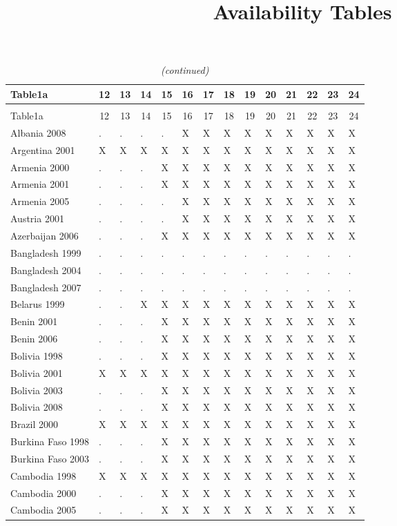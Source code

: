 \documentclass[a4paper]{article}
\begin{document}
\title{Availability Tables}
\maketitle


\pagebreak
%

\setlongtables


\begin{longtable}{llllllllllllll} \caption{Availability In Union}\tabularnewline
 \hline\hline
\multicolumn{1}{l}{Table1a}&\multicolumn{1}{c}{12}&\multicolumn{1}{c}{13}&\multicolumn{1}{c}{14}&\multicolumn{1}{c}{15}&\multicolumn{1}{c}{16}&\multicolumn{1}{c}{17}&\multicolumn{1}{c}{18}&\multicolumn{1}{c}{19}&\multicolumn{1}{c}{20}&\multicolumn{1}{c}{21}&\multicolumn{1}{c}{22}&\multicolumn{1}{c}{23}&\multicolumn{1}{c}{24}\tabularnewline
\hline
\endfirsthead
\caption[]{\em (continued)} \tabularnewline
\hline
\multicolumn{1}{l}{Table1a}&\multicolumn{1}{c}{12}&\multicolumn{1}{c}{13}&\multicolumn{1}{c}{14}&\multicolumn{1}{c}{15}&\multicolumn{1}{c}{16}&\multicolumn{1}{c}{17}&\multicolumn{1}{c}{18}&\multicolumn{1}{c}{19}&\multicolumn{1}{c}{20}&\multicolumn{1}{c}{21}&\multicolumn{1}{c}{22}&\multicolumn{1}{c}{23}&\multicolumn{1}{c}{24}\tabularnewline
\hline
\endhead
\hline
\endfoot
\label{Table1a}
Albania 2008&.&.&.&.&X&X&X&X&X&X&X&X&X\tabularnewline
Argentina 2001&X&X&X&X&X&X&X&X&X&X&X&X&X\tabularnewline
Armenia 2000&.&.&.&X&X&X&X&X&X&X&X&X&X\tabularnewline
Armenia 2001&.&.&.&X&X&X&X&X&X&X&X&X&X\tabularnewline
Armenia 2005&.&.&.&.&X&X&X&X&X&X&X&X&X\tabularnewline
Austria 2001&.&.&.&.&X&X&X&X&X&X&X&X&X\tabularnewline
Azerbaijan 2006&.&.&.&X&X&X&X&X&X&X&X&X&X\tabularnewline
Bangladesh 1999&.&.&.&.&.&.&.&.&.&.&.&.&.\tabularnewline
Bangladesh 2004&.&.&.&.&.&.&.&.&.&.&.&.&.\tabularnewline
Bangladesh 2007&.&.&.&.&.&.&.&.&.&.&.&.&.\tabularnewline
Belarus 1999&.&.&X&X&X&X&X&X&X&X&X&X&X\tabularnewline
Benin 2001&.&.&.&X&X&X&X&X&X&X&X&X&X\tabularnewline
Benin 2006&.&.&.&X&X&X&X&X&X&X&X&X&X\tabularnewline
Bolivia 1998&.&.&.&X&X&X&X&X&X&X&X&X&X\tabularnewline
Bolivia 2001&X&X&X&X&X&X&X&X&X&X&X&X&X\tabularnewline
Bolivia 2003&.&.&.&X&X&X&X&X&X&X&X&X&X\tabularnewline
Bolivia 2008&.&.&.&X&X&X&X&X&X&X&X&X&X\tabularnewline
Brazil 2000&X&X&X&X&X&X&X&X&X&X&X&X&X\tabularnewline
Burkina Faso 1998&.&.&.&X&X&X&X&X&X&X&X&X&X\tabularnewline
Burkina Faso 2003&.&.&.&X&X&X&X&X&X&X&X&X&X\tabularnewline
Cambodia 1998&X&X&X&X&X&X&X&X&X&X&X&X&X\tabularnewline
Cambodia 2000&.&.&.&X&X&X&X&X&X&X&X&X&X\tabularnewline
Cambodia 2005&.&.&.&X&X&X&X&X&X&X&X&X&X\tabularnewline

\end{longtable}
\end{document}
